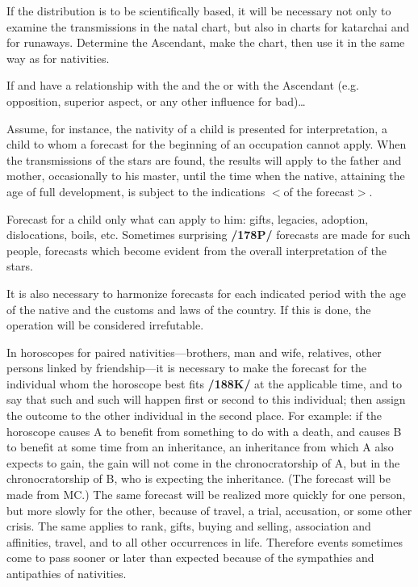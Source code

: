 If the distribution is to be scientifically based, it will be necessary not only to examine the transmissions in the natal chart, but also in charts for katarchai and for runaways. 
Determine the Ascendant, make the chart, then use it in the same way as for nativities.

If \Saturn\xspace and \Mars\xspace have a relationship with the \Sun\xspace and the \Moon\xspace or with the Ascendant (e.g.
opposition, superior aspect, or any other influence for bad)\ldots

Assume, for instance, the nativity of a child is presented for interpretation, a child to whom a forecast for the beginning of an occupation cannot apply. When the transmissions of the stars are found, the results will apply to the father and mother, occasionally to his master, until the time when the native, attaining the age of full development, is subject to the indications $<$of the forecast$>$. 

Forecast for a child only what can apply to him: gifts, legacies, adoption, dislocations, boils, etc. Sometimes surprising \textbf{/178P/} forecasts are made for such people, forecasts which become evident from the overall interpretation of the stars. 

It is also necessary to harmonize forecasts for each indicated period with the age of the native and the customs and laws of the country. If this is done, the operation will be considered irrefutable. 

In horoscopes for paired nativities—brothers, man and wife, relatives, other persons linked by friendship—it is necessary to make the forecast for the individual whom the horoscope best fits \textbf{/188K/} at the applicable time, and to say that such and such will happen first or second to this individual; then assign the outcome to the other individual in the second place. For example: if the horoscope causes A to benefit from something to do with a death, and causes B to benefit at some time from an inheritance, an inheritance from which A also expects to gain, the gain will not come in the chronocratorship of A, but in the chronocratorship of B, who is expecting the inheritance. (The forecast will be made from MC.) The
same forecast will be realized more quickly for one person, but more slowly for the other, because of travel, a trial, accusation, or some other crisis. The same applies to rank, gifts, buying and selling, association and affinities, travel, and to all other occurrences in life. Therefore events sometimes come to pass sooner or later than expected because of the sympathies and antipathies of nativities. 

